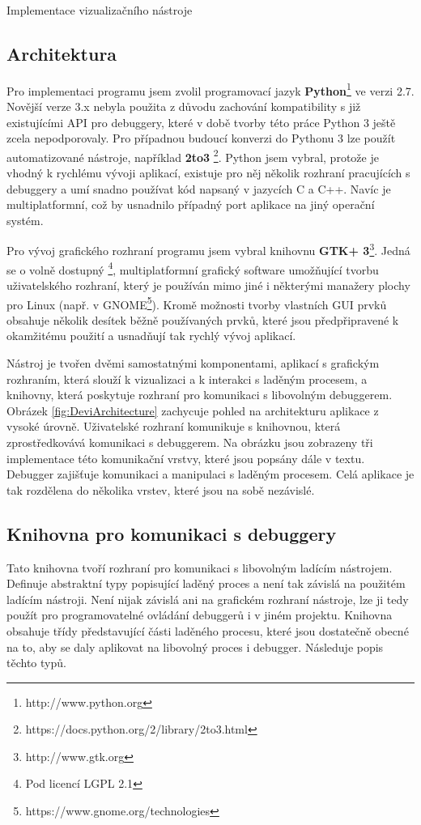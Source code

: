 \documentclass[bc,male,python,dept460]{diploma}						%
\newcommand{\parspace}[1][]{
	\ifthenelse{\isempty{#1}}{\vspace{5mm}}{\vspace{#1}}
	\par
}
\begin{document}
\begin{section}{Implementace vizualizačního nástroje}
	\subsection{Architektura}
	\par Pro implementaci programu jsem zvolil programovací jazyk \textbf{Python}\footnote{http://www.python.org} ve verzi 2.7. Novější verze 3.x nebyla použita
	z důvodu zachování kompatibility s již existujícími API pro debuggery, které v době tvorby této práce Python 3 ještě zcela nepodporovaly. Pro případnou
	budoucí konverzi do Pythonu 3 lze použít automatizované nástroje, například \textbf{2to3} \footnote{https://docs.python.org/2/library/2to3.html}.
	Python jsem vybral, protože je vhodný k rychlému vývoji aplikací, existuje pro něj několik rozhraní pracujících s debuggery a umí snadno používat
	kód napsaný v jazycích C a C++. Navíc je multiplatformní, což by usnadnilo případný port aplikace na jiný operační systém.
	
	\parspace Pro vývoj grafického rozhraní programu jsem vybral knihovnu \textbf{GTK+ 3}\footnote{http://www.gtk.org}. Jedná se o volně dostupný
	\footnote{Pod licencí LGPL 2.1}, multiplatformní grafický software umožňující tvorbu uživatelského rozhraní, který je používán mimo jiné i
	některými manažery plochy pro Linux (např. v GNOME\footnote{https://www.gnome.org/technologies}). Kromě možnosti tvorby vlastních
	GUI prvků obsahuje několik desítek běžně používaných prvků, které jsou předpřipravené k okamžitému použití a usnadňují tak rychlý vývoj aplikací.
	
	\parspace Nástroj je tvořen dvěmi samostatnými komponentami, aplikací s grafickým rozhraním, která slouží k vizualizaci a k interakci s laděným procesem,
	a knihovny, která poskytuje rozhraní pro komunikaci s libovolným debuggerem. Obrázek \ref{fig:DeviArchitecture} zachycuje pohled na architekturu aplikace
	z vysoké úrovně.
	Uživatelské rozhraní komunikuje s knihovnou, která zprostředkovává komunikaci s debuggerem. Na obrázku jsou zobrazeny tři implementace této komunikační vrstvy,
	které jsou popsány dále v textu. Debugger zajišťuje komunikaci a manipulaci s laděným procesem. Celá aplikace je tak rozdělena do několika
	vrstev, které jsou na sobě nezávislé.
	
		
	\subsection{Knihovna pro komunikaci s debuggery}
		Tato knihovna tvoří rozhraní pro komunikaci s libovolným ladícím nástrojem. Definuje abstraktní typy popisující laděný proces a není tak závislá na
		použitém ladícím nástroji. Není nijak závislá ani na grafickém rozhraní nástroje, lze ji tedy použít pro programovatelné ovládání debuggerů i v jiném
		projektu. Knihovna obsahuje třídy představující části laděného procesu, které jsou dostatečně obecné na to, aby se daly aplikovat na libovolný
		proces i debugger. Následuje popis těchto typů.
		

\end{section}
\end{document}
